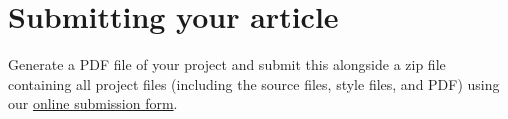 \documentclass[10pt,a4paper]{article}
\begin{document}
\section*{Submitting your article}
Generate a PDF file of your project and submit this alongside a zip file containing all project files (including the source files, style files, and PDF) using our \href{https://open-research-europe.ec.europa.eu/for-authors/publish-your-research}{online submission form}. 



\end{document}
